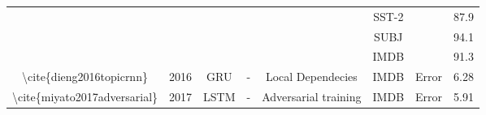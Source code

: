 \begin{table}[]
\begin{tabular}{|c|c|c|c|c|c|cc|}
                                                                                          &                                            &                                                   &                                                           &                                                                                                                        & SST-2                                                 & \multicolumn{1}{c|}{}                                                                                                              & 87.9                       \\ \cline{6-6} \cline{8-8} 
                                                                                          &                                            &                                                   &                                                           &                                                                                                                        & SUBJ                                                  & \multicolumn{1}{c|}{}                                                                                                              & 94.1                       \\ \cline{6-6} \cline{8-8} 
                                                                                          &                                            &                                                   &                                                           &                                                                                                                        & IMDB                                                  & \multicolumn{1}{c|}{}                                                                                                              & 91.3                       \\ \hline
    \textbackslash{}cite\{dieng2016topicrnn\}                                             & 2016                                       & GRU                                               & -                                                         & Local Dependecies                                                                                                      & IMDB                                                  & \multicolumn{1}{c|}{Error}                                                                                                         & 6.28                       \\ \hline
    \multirow{5}{*}{\textbackslash{}cite\{miyato2017adversarial\}}                        & \multirow{5}{*}{2017}                      & \multirow{5}{*}{LSTM}                             & \multirow{5}{*}{-}                                        & \multirow{5}{*}{Adversarial training}                                                                                  & IMDB                                                  & \multicolumn{1}{c|}{\multirow{5}{*}{Error}}                                                                                        & 5.91                       \\ \cline{6-6} \cline{8-8} 

\end{tabular}
\end{table}
